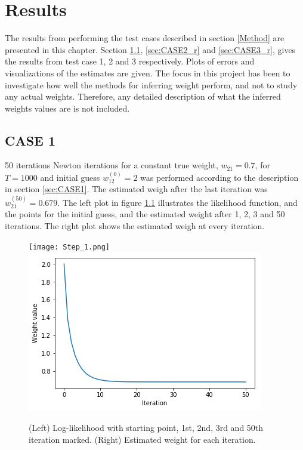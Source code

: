 
\chapter{Results}
\label{ch:results}

The results from performing the test cases described in section \ref{Method} are presented in this chapter. Section \ref{sec:CASE1_r}, \ref{sec:CASE2_r} and \ref{sec:CASE3_r}, gives the results from test case 1, 2 and 3 respectively. Plots of errors and visualizations of the estimates are given. The focus in this project has been to investigate how well the methods for inferring weight perform, and not to study any actual weights. Therefore, any detailed description of what the inferred weights values are is not included.

\section{CASE 1}
\label{sec:CASE1_r}
50 iterations Newton iterations for a constant true weight, $w_{21} = 0.7$, for $T=1000$ and initial guess $w_{12}^{(0)} = 2$ was performed according to the description in section \ref{sec:CASE1}. The estimated weigh after the last iteration was $w_{21}^{(50)}=0.679$. The left plot in figure \ref{fig:Newton} illustrates the likelihood function, and the points for the initial guess, and the estimated weight after 1, 2, 3 and 50 iterations. The right plot shows the estimated weigh at every iteration.



\begin{figure}[hbt!]
\caption{(Left) Log-likelihood with starting point, 1st, 2nd, 3rd and 50th iteration marked. (Right) Estimated weight for each iteration.}
\label{fig:Newton}
    \centering
    \texttt{[image: Step\_1.png]}
    \includegraphics[scale=0.40]{fig/Step_1_it.png}
\end{figure}

